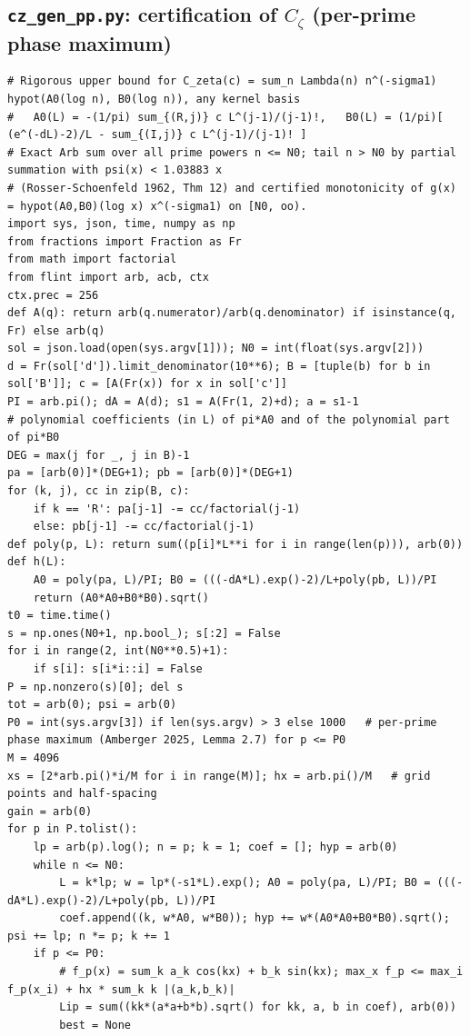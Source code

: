 \documentclass[11pt,reqno]{amsart}
\numberwithin{equation}{section}
\theoremstyle{definition}
\theoremstyle{remark}
\begin{document}
\subsection*{\texttt{cz\_gen\_pp.py}: certification of $C_\zeta$ (per-prime phase maximum)}
\label{app:cert_cz}
\begin{lstlisting}
# Rigorous upper bound for C_zeta(c) = sum_n Lambda(n) n^(-sigma1) hypot(A0(log n), B0(log n)), any kernel basis
#   A0(L) = -(1/pi) sum_{(R,j)} c L^(j-1)/(j-1)!,   B0(L) = (1/pi)[ (e^(-dL)-2)/L - sum_{(I,j)} c L^(j-1)/(j-1)! ]
# Exact Arb sum over all prime powers n <= N0; tail n > N0 by partial summation with psi(x) < 1.03883 x
# (Rosser-Schoenfeld 1962, Thm 12) and certified monotonicity of g(x) = hypot(A0,B0)(log x) x^(-sigma1) on [N0, oo).
import sys, json, time, numpy as np
from fractions import Fraction as Fr
from math import factorial
from flint import arb, acb, ctx
ctx.prec = 256
def A(q): return arb(q.numerator)/arb(q.denominator) if isinstance(q, Fr) else arb(q)
sol = json.load(open(sys.argv[1])); N0 = int(float(sys.argv[2]))
d = Fr(sol['d']).limit_denominator(10**6); B = [tuple(b) for b in sol['B']]; c = [A(Fr(x)) for x in sol['c']]
PI = arb.pi(); dA = A(d); s1 = A(Fr(1, 2)+d); a = s1-1
# polynomial coefficients (in L) of pi*A0 and of the polynomial part of pi*B0
DEG = max(j for _, j in B)-1
pa = [arb(0)]*(DEG+1); pb = [arb(0)]*(DEG+1)
for (k, j), cc in zip(B, c):
    if k == 'R': pa[j-1] -= cc/factorial(j-1)
    else: pb[j-1] -= cc/factorial(j-1)
def poly(p, L): return sum((p[i]*L**i for i in range(len(p))), arb(0))
def h(L):
    A0 = poly(pa, L)/PI; B0 = (((-dA*L).exp()-2)/L+poly(pb, L))/PI
    return (A0*A0+B0*B0).sqrt()
t0 = time.time()
s = np.ones(N0+1, np.bool_); s[:2] = False
for i in range(2, int(N0**0.5)+1):
    if s[i]: s[i*i::i] = False
P = np.nonzero(s)[0]; del s
tot = arb(0); psi = arb(0)
P0 = int(sys.argv[3]) if len(sys.argv) > 3 else 1000   # per-prime phase maximum (Amberger 2025, Lemma 2.7) for p <= P0
M = 4096
xs = [2*arb.pi()*i/M for i in range(M)]; hx = arb.pi()/M   # grid points and half-spacing
gain = arb(0)
for p in P.tolist():
    lp = arb(p).log(); n = p; k = 1; coef = []; hyp = arb(0)
    while n <= N0:
        L = k*lp; w = lp*(-s1*L).exp(); A0 = poly(pa, L)/PI; B0 = (((-dA*L).exp()-2)/L+poly(pb, L))/PI
        coef.append((k, w*A0, w*B0)); hyp += w*(A0*A0+B0*B0).sqrt(); psi += lp; n *= p; k += 1
    if p <= P0:
        # f_p(x) = sum_k a_k cos(kx) + b_k sin(kx); max_x f_p <= max_i f_p(x_i) + hx * sum_k k |(a_k,b_k)|
        Lip = sum((kk*(a*a+b*b).sqrt() for kk, a, b in coef), arb(0))
        best = None

\end{lstlisting}
\end{document}

